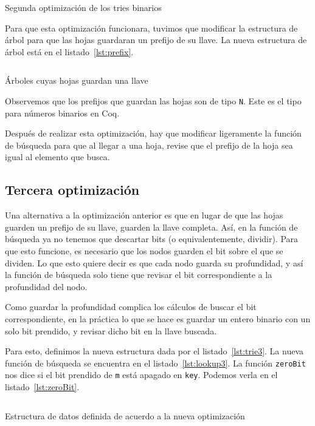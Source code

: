 \documentclass[11pt,letterpaper]{article}
\begin{document}
\begin{listing}[H]
  \inputminted{coq}{src/smart2.v}
  \caption{Segunda optimización de los tries binarios}
  \label{lst:opt2}
\end{listing}

Para que esta optimización funcionara, tuvimos que modificar la estructura de árbol para que las hojas guardaran un prefijo de su llave. La nueva estructura de árbol está en el listado~\ref{lst:prefix}.

\begin{listing}[H]
  \inputminted{coq}{src/prefix.v}
  \caption{Árboles cuyas hojas guardan una llave}
  \label{lst:prefix}
\end{listing}

Observemos que los prefijos que guardan las hojas son de tipo \texttt{N}. Este es el tipo para números binarios en Coq.

Después de realizar esta optimización, hay que modificar ligeramente la función de búsqueda para que al llegar a una hoja, revise que el prefijo de la hoja sea igual al elemento que busca.

\subsection{Tercera optimización}

\noindent Una alternativa a la optimización anterior es que en lugar de que las hojas guarden un prefijo de su llave, guarden la llave completa. Así, en la función de búsqueda ya no tenemos que descartar bits (o equivalentemente, dividir). Para que esto funcione, es necesario que los nodos guarden el bit sobre el que se dividen. Lo que esto quiere decir es que cada nodo guarda su profundidad, y así la función de búsqueda solo tiene que revisar el bit correspondiente a la profundidad del nodo.

Como guardar la profundidad complica los cálculos de buscar el bit correspondiente, en la práctica lo que se hace es guardar un entero binario con un solo bit prendido, y revisar dicho bit en la llave buscada.

Para esto, definimos la nueva estructura dada por el listado~\ref{lst:trie3}. La nueva función de búsqueda se encuentra en el listado~\ref{lst:lookup3}. La función \texttt{zeroBit} nos dice si el bit prendido de \texttt{m} está apagado en \texttt{key}. Podemos verla en el listado~\ref{lst:zeroBit}.

\begin{listing}[H]
  \inputminted{coq}{src/trie3.v}
  \caption{Estructura de datos definida de acuerdo a la nueva optimización}
  \label{lst:trie3}
\end{listing}
\end{document}
